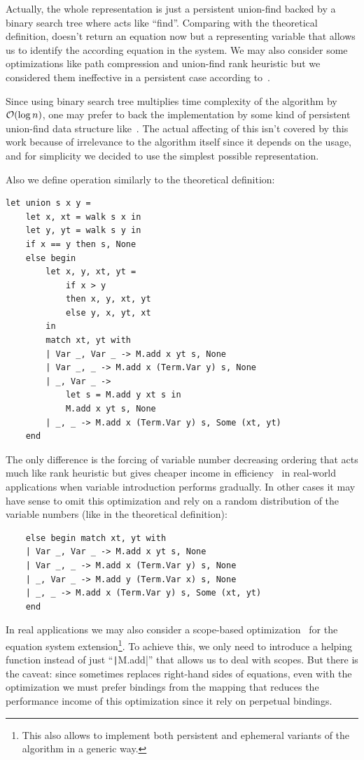 Actually, the whole representation is just a persistent union-find backed by a binary search tree where \walk acts like ``find''. Comparing with the theoretical definition, \walk doesn't return an equation now but a representing variable that allows us to identify the according equation in the system. We may also consider some optimizations like path compression and union-find rank heuristic but we considered them ineffective in a persistent case according to~\cite{domoratskiy2025empirical}.

Since using binary search tree multiplies time complexity of the algorithm by $\mathcal{O}(\log n)$, one may prefer to back the implementation by some kind of persistent union-find data structure like~\cite{conchon2007persistent}. The actual affecting of this isn't covered by this work because of irrelevance to the algorithm itself since it depends on the usage, and for simplicity we decided to use the simplest possible representation.

Also we define \union operation similarly to the theoretical definition:
\begin{verbatim}
let union s x y =
    let x, xt = walk s x in
    let y, yt = walk s y in
    if x == y then s, None
    else begin
        let x, y, xt, yt =
            if x > y
            then x, y, xt, yt
            else y, x, yt, xt
        in
        match xt, yt with
        | Var _, Var _ -> M.add x yt s, None
        | Var _, _ -> M.add x (Term.Var y) s, None
        | _, Var _ ->
            let s = M.add y xt s in
            M.add x yt s, None
        | _, _ -> M.add x (Term.Var y) s, Some (xt, yt)
    end
\end{verbatim}

The only difference is the forcing of variable number decreasing ordering that acts much like rank heuristic but gives cheaper income in efficiency~\cite{domoratskiy2025empirical, mannila1986complexity} in real-world applications when variable introduction performs gradually. In other cases it may have sense to omit this optimization and rely on a random distribution of the variable numbers (like in the theoretical definition):
\begin{verbatim}
    else begin match xt, yt with
    | Var _, Var _ -> M.add x yt s, None
    | Var _, _ -> M.add x (Term.Var y) s, None
    | _, Var _ -> M.add y (Term.Var x) s, None
    | _, _ -> M.add x (Term.Var y) s, Some (xt, yt)
    end
\end{verbatim}

In real applications we may also consider a scope-based optimization~\cite{friedman2009relational} for the equation system extension\footnote{This also allows to implement both persistent and ephemeral variants of the algorithm in a generic way.}. To achieve this, we only need to introduce a helping function instead of just ``\texttt|M.add|'' that allows us to deal with scopes. But there is the caveat: since \union sometimes replaces right-hand sides of equations, even with the optimization we must prefer bindings from the mapping that reduces the performance income of this optimization since it rely on perpetual bindings.

